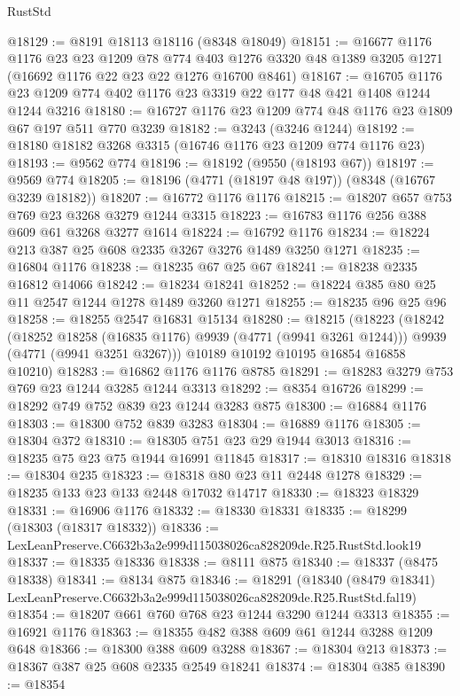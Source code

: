 \begin{lexlean}{RustStd}
\begin{coremodule}
@18129 := @8191 @18113 @18116 (@8348 @18049)
@18151 := @16677
    @1176
    @1176
    @23
    @23
    @1209
    @78
    @774
    @403
    @1276
    @3320
    @48
    @1389
    @3205
    @1271
    (@16692 @1176 @22 @23 @22 @1276 @16700 @8461)
@18167 := @16705 @1176 @23 @1209 @774 @402 @1176 @23 @3319 @22 @177 @48 @421 @1408 @1244 @1244 @3216
@18180 := @16727 @1176 @23 @1209 @774 @48 @1176 @23 @1809 @67 @197 @511 @770 @3239
@18182 := @3243 (@3246 @1244)
@18192 := @18180 @18182 @3268 @3315 (@16746 @1176 @23 @1209 @774 @1176 @23)
@18193 := @9562 @774
@18196 := @18192 (@9550 (@18193 @67))
@18197 := @9569 @774
@18205 := @18196 (@4771 (@18197 @48 @197)) (@8348 (@16767 @3239 @18182))
@18207 := @16772 @1176 @1176
@18215 := @18207 @657 @753 @769 @23 @3268 @3279 @1244 @3315
@18223 := @16783 @1176 @256 @388 @609 @61 @3268 @3277 @1614
@18224 := @16792 @1176
@18234 := @18224 @213 @387 @25 @608 @2335 @3267 @3276 @1489 @3250 @1271
@18235 := @16804 @1176
@18238 := @18235 @67 @25 @67
@18241 := @18238 @2335 @16812 @14066
@18242 := @18234 @18241
@18252 := @18224 @385 @80 @25 @11 @2547 @1244 @1278 @1489 @3260 @1271
@18255 := @18235 @96 @25 @96
@18258 := @18255 @2547 @16831 @15134
@18280 := @18215
    (@18223
      (@18242
        (@18252 @18258 (@16835 @1176) @9939 (@4771 (@9941 @3261 @1244)))
        @9939
        (@4771 (@9941 @3251 @3267)))
      @10189
      @10192
      @10195
      @16854
      @16858
      @10210)
@18283 := @16862 @1176 @1176 @8785
@18291 := @18283 @3279 @753 @769 @23 @1244 @3285 @1244 @3313
@18292 := @8354 @16726
@18299 := @18292 @749 @752 @839 @23 @1244 @3283 @875
@18300 := @16884 @1176
@18303 := @18300 @752 @839 @3283
@18304 := @16889 @1176
@18305 := @18304 @372
@18310 := @18305 @751 @23 @29 @1944 @3013
@18316 := @18235 @75 @23 @75 @1944 @16991 @11845
@18317 := @18310 @18316
@18318 := @18304 @235
@18323 := @18318 @80 @23 @11 @2448 @1278
@18329 := @18235 @133 @23 @133 @2448 @17032 @14717
@18330 := @18323 @18329
@18331 := @16906 @1176
@18332 := @18330 @18331
@18335 := @18299 (@18303 (@18317 @18332))
@18336 := LexLeanPreserve.C6632b3a2e999d115038026ca828209de.R25.RustStd.look19
@18337 := @18335 @18336
@18338 := @8111 @875
@18340 := @18337 (@8475 @18338)
@18341 := @8134 @875
@18346 := @18291
    (@18340 (@8479 @18341) LexLeanPreserve.C6632b3a2e999d115038026ca828209de.R25.RustStd.fal19)
@18354 := @18207 @661 @760 @768 @23 @1244 @3290 @1244 @3313
@18355 := @16921 @1176
@18363 := @18355 @482 @388 @609 @61 @1244 @3288 @1209 @648
@18366 := @18300 @388 @609 @3288
@18367 := @18304 @213
@18373 := @18367 @387 @25 @608 @2335 @2549 @18241
@18374 := @18304 @385
@18390 := @18354

\end{coremodule}
\end{lexlean}

